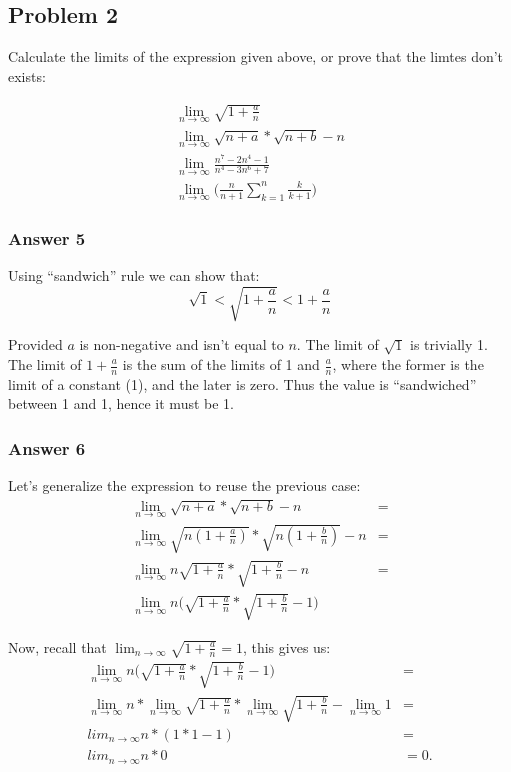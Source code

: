\documentclass[11pt]{article}
\begin{document}
\subsection{Problem 2}
\label{sec-1-2}
Calculate the limits of the expression given above, or prove that the limtes don't
exists:

\begin{eqnarray}
  \lim_{n \to \infty} \sqrt{1 + \frac{a}{n}} \\
  \lim_{n \to \infty} \sqrt{n + a} * \sqrt{n + b} - n \\
  \lim_{n \to \infty} \frac{n^7 - 2n^4 - 1}{n^4 - 3n^6 + 7} \\
  \lim_{n \to \infty} \Big(\frac{n}{n + 1} \sum_{k=1}^n \frac{k}{k+1} \Big)
\end{eqnarray}

\subsubsection{Answer 5}
\label{sec-1-2-1}
Using ``sandwich'' rule we can show that:
\begin{equation*}
  \sqrt{1} < \sqrt{1 + \frac{a}{n}} < 1 + \frac{a}{n}
\end{equation*}

Provided $a$ is non-negative and isn't equal to $n$.  The limit of $\sqrt{1}$
is trivially 1.  The limit of $1 + \frac{a}{n}$ is the sum of the limits of
1 and $\frac{a}{n}$, where the former is the limit of a constant (1), and the
later is zero.  Thus the value is ``sandwiched'' between 1 and 1, hence it
must be 1.
\subsubsection{Answer 6}
\label{sec-1-2-2}
Let's generalize the expression to reuse the previous case:
\begin{equation*}
  \begin{aligned}
    \lim_{n \to \infty} \sqrt{n + a} * \sqrt{n + b} - n &= \\
    \lim_{n \to \infty} \sqrt{n(1 + \frac{a}{n})} * \sqrt{n(1 + \frac{b}{n})} - n &= \\
    \lim_{n \to \infty} n\sqrt{1 + \frac{a}{n}} * \sqrt{1 + \frac{b}{n}} - n &= \\
    \lim_{n \to \infty} n\Big(\sqrt{1 + \frac{a}{n}} * \sqrt{1 + \frac{b}{n}} - 1\Big)
  \end{aligned}
\end{equation*}

Now, recall that $\lim_{n \to \infty} \sqrt{1 + \frac{a}{n}} = 1$, this gives us:
\begin{equation*}
  \begin{aligned}
    \lim_{n \to \infty} n\Big(\sqrt{1 + \frac{a}{n}} * \sqrt{1 + \frac{b}{n}} - 1\Big) &= \\
    \lim_{n \to \infty} n * \lim_{n \to \infty}\sqrt{1 + \frac{a}{n}} *
    \lim_{n \to \infty}\sqrt{1 + \frac{b}{n}} - \lim_{n \to \infty} 1 &= \\
    lim_{n \to \infty} n * (1 * 1 - 1) &= \\
    lim_{n \to \infty} n * 0 &= 0.
  \end{aligned}
\end{equation*}
\end{document}
